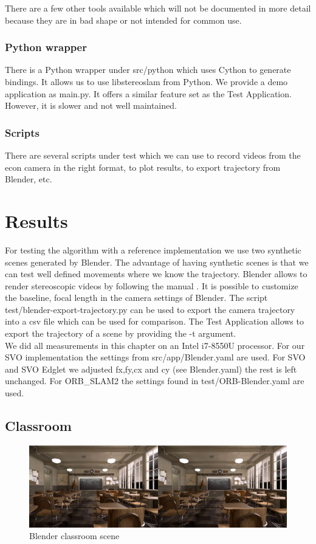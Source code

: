 \documentclass[11pt,a4paper,titlepage,oneside]{report}
\begin{document}
There are a few other tools available which will not be documented in more detail because they are in bad shape or not intended for common use.

\subsection{Python wrapper}
There is a Python wrapper under src/python which uses Cython to generate bindings. It allows us to use libstereoslam from Python. We provide a demo application as main.py. It offers a similar feature set as the Test Application. However, it is slower and not well maintained.

\subsection{Scripts}
There are several scripts under test which we can use to record videos from the econ camera in the right format, to plot results, to export trajectory from Blender, etc.

\chapter{Results}\label{ch:results}

For testing the algorithm with a reference implementation we use two synthetic scenes generated by Blender. The advantage of having synthetic scenes is that we can test well defined movements where we know the trajectory. Blender allows to render stereoscopic videos by following the manual \cite{blender_stereo}. It is possible to customize the baseline, focal length in the camera settings of Blender. The script test/blender-export-trajectory.py can be used to export the camera trajectory into a csv file which can be used for comparison. The Test Application allows to export the trajectory of a scene by providing the -t argument.\\
We did all measurements in this chapter on an Intel i7-8550U processor. For our SVO implementation the settings from src/app/Blender.yaml are used. For SVO and SVO Edglet we adjusted fx,fy,cx and cy (see Blender.yaml) the rest is left unchanged. For ORB\_SLAM2 the settings found in test/ORB-Blender.yaml are used.

\section{Classroom}
\begin{figure}[H]
  \centering
  \includegraphics[width=1.0\textwidth]{img/blender_classroom_scene.png}
  \caption{Blender classroom scene}\label{fig:blender_classroom_scene}
\end{figure}
\end{document}
